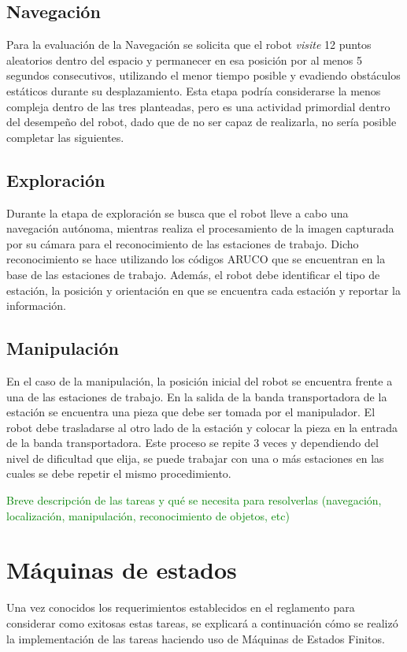 \subsection{Navegación}
Para la evaluación de la Navegación se solicita que el robot \textit{visite} 12 puntos aleatorios dentro del espacio y permanecer en esa posición por al menos 5 segundos consecutivos, utilizando el menor tiempo posible y evadiendo obstáculos estáticos durante su desplazamiento.
Esta etapa podría considerarse la menos compleja dentro de las tres planteadas, pero es una actividad primordial dentro del desempeño del robot, dado que de no ser capaz de realizarla, no sería posible completar las siguientes.

\subsection{Exploración}
Durante la etapa de exploración se busca que el robot lleve a cabo una navegación autónoma, mientras realiza el procesamiento de la imagen capturada por su cámara para el reconocimiento de las estaciones de trabajo. Dicho reconocimiento se hace utilizando los códigos ARUCO que se encuentran en la base de las estaciones de trabajo. Además, el robot debe identificar el tipo de estación, la posición y orientación en que se encuentra cada estación y reportar la información.

\subsection{Manipulación}
En el caso de la manipulación, la posición inicial del robot se encuentra frente a una de las estaciones de trabajo. En la salida de la banda transportadora de la estación se encuentra una pieza que debe ser tomada por el manipulador. El robot debe trasladarse al otro lado de la estación y colocar la pieza en la entrada de la banda transportadora. Este proceso se repite 3 veces y dependiendo del nivel de dificultad que elija, se puede trabajar con una o más estaciones en las cuales se debe repetir el mismo procedimiento. 


\textcolor{green}{Breve descripción de las tareas y qué se necesita para resolverlas (navegación, localización, manipulación, reconocimiento de objetos, etc)}

\section{Máquinas de estados}
Una vez conocidos los requerimientos establecidos en el reglamento para considerar como exitosas estas tareas, se explicará a continuación cómo se realizó la implementación de las tareas haciendo uso de Máquinas de Estados Finitos.

